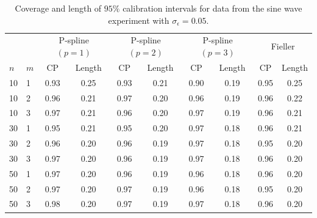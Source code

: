 \documentclass[cmfont,usenames,dvipsnames,leqno]{afit-etd}\usepackage[]{graphicx}\usepackage[]{color}
\begin{document}
\begin{table}[H]%
\centering
\caption[Semiparametric calibration Monte Carlo simulation]{Coverage and length of $95\%$ calibration intervals for data from the sine wave experiment with $\sigma_\epsilon = 0.05$. \label{tab:pspline-monte-carlo-1}}
  \begin{tabular}{llcccccccc}
  \toprule
  \phantom{abc} & \phantom{abc} & \multicolumn{2}{c}{P-spline $\left(p=1\right)$} & \multicolumn{2}{c}{P-spline $\left(p=2\right)$} & \multicolumn{2}{c}{P-spline $\left(p=3\right)$} & \multicolumn{2}{c}{Fieller} \\
  \cline{3-10}
  $n$ & $m$ & CP & Length & CP & Length & CP & Length & CP & Length \\
  \hline
  10  &  1  & 0.93 & 0.25 & 0.93 & 0.21 & 0.90 & 0.19 & 0.95 & 0.25 \\
  10  &  2  & 0.96 & 0.21 & 0.97 & 0.20 & 0.96 & 0.19 & 0.96 & 0.22 \\
  10  &  3  & 0.97 & 0.21 & 0.96 & 0.20 & 0.97 & 0.19 & 0.96 & 0.21 \\
  \hline
  30  &  1  & 0.95 & 0.21 & 0.95 & 0.20 & 0.97 & 0.18 & 0.96 & 0.21 \\
  30  &  2  & 0.96 & 0.20 & 0.96 & 0.19 & 0.97 & 0.18 & 0.95 & 0.20 \\
  30  &  3  & 0.97 & 0.20 & 0.96 & 0.19 & 0.97 & 0.18 & 0.96 & 0.20 \\
  \hline
  50  &  1  & 0.97 & 0.20 & 0.96 & 0.19 & 0.96 & 0.18 & 0.96 & 0.20 \\
  50  &  2  & 0.97 & 0.20 & 0.97 & 0.19 & 0.96 & 0.18 & 0.95 & 0.20 \\
  50  &  3  & 0.98 & 0.20 & 0.97 & 0.19 & 0.97 & 0.18 & 0.96 & 0.20 \\
  \bottomrule
  \end{tabular}
\end{table}
\end{document}
